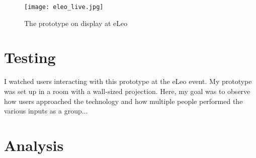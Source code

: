 \begin{figure}[t]
	\centering

	\texttt{[image: eleo\_live.jpg]}
	\caption{The prototype on display at eLeo}

	\label{prototyping2.4}
\end{figure}


\section{Testing}

I watched users interacting with this prototype at the eLeo event. My prototype was set up in a room with a wall-sized projection. Here, my goal was to observe how users approached the technology and how multiple people performed the various inputs as a group...


\section{Analysis}
